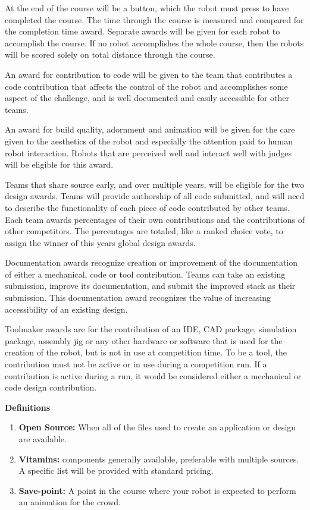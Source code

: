 \documentclass{article}
\begin{document}
 At the end of the course will be a button, which the robot must press to have completed the course. The time through the course is measured and compared for the completion time award. Separate awards will be given for each robot to accomplish the course. If no robot accomplishes the whole course, then the robots will be scored solely on total distance through the course. 
 
 An award for contribution to code will be given to the team that contributes a code contribution that affects the control of the robot and accomplishes some aspect of the challenge, and is well documented and easily accessible for other teams.
 
 An award for build quality, adornment and animation will be given for the care given to the aesthetics of the robot and especially the attention paid to human robot interaction. Robots that are perceived well and interact well with judges will be eligible for this award. 
 
  Teams that share source early, and over multiple years, will be eligible for the two design awards. Teams will provide authorship of all code submitted, and will need to describe the functionality of each piece of code contributed by other teams. Each team awards percentages of their own contributions and the contributions of other competitors. The percentages are totaled, like a ranked choice vote, to assign the winner of this years global design awards. 
  
  Documentation awards recognize creation or improvement of the documentation of either a mechanical, code or tool contribution. Teams can take an existing  submission, improve its documentation, and submit the improved stack as their submission. This documentation award recognizes the value of increasing accessibility of an existing design. 
  
  Toolmaker awards are for the contribution of an IDE, CAD package, simulation package, assembly jig or any other hardware or software that is used for the creation of the robot, but is not in use at competition time. To be a tool, the contribution must not be active or in use during a competition run. If a contribution is active during a run, it would be considered either a mechanical or code design contribution. 
 
 \pagebreak
 
{\huge \textbf{Definitions}}
\begin{enumerate}
	\item \textbf{Open Source:} When all of the files used to create an application or design are available.
	\item \textbf{Vitamins:} components generally available, preferable with multiple sources. A specific list will be provided with standard pricing.
	\item \textbf{Save-point:} A point in the course where your robot is expected to perform an animation for the crowd.  
\end{enumerate}
\end{document}
